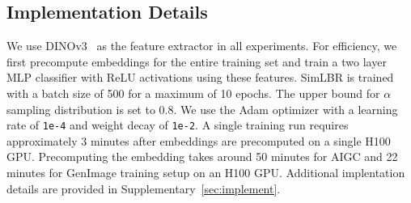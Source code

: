 \subsection{Implementation Details}
We use DINOv3~\cite{simeoni2025dinov3} as the feature extractor in all experiments. For efficiency, we first precompute embeddings for the entire training set and train a two layer MLP classifier with ReLU activations using these features. SimLBR is trained with a batch size of 500 for a maximum of 10 epochs. The upper bound for $\alpha$ sampling distribution is set to $0.8$. We use the Adam optimizer with a learning rate of \texttt{1e-4} and weight decay of \texttt{1e-2}. A single training run requires approximately 3 minutes after embeddings are precomputed on a single H100 GPU. Precomputing the embedding takes around 50 minutes for AIGC and 22 minutes for GenImage training setup on an H100 GPU. Additional implentation details are provided in Supplementary~\ref{sec:implement}.


